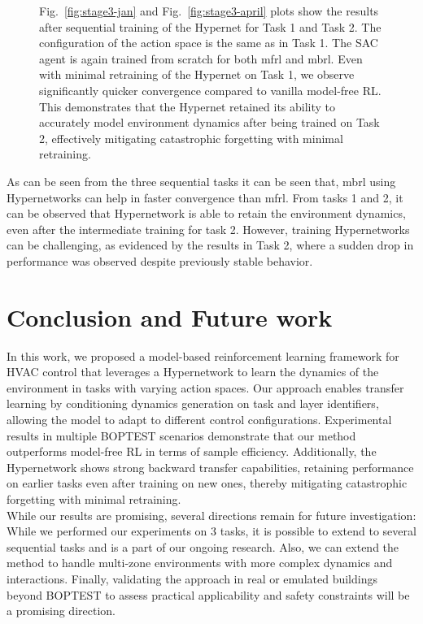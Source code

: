 \documentclass{article}
\begin{document}
\begin{figure}[H]
  \begin{minipage}[t]{\textwidth}
    \small
    Fig.~\ref{fig:stage3-jan} and Fig.~\ref{fig:stage3-april} plots show the results after sequential training of the Hypernet for Task 1 and Task 2. The configuration of the action space is the same as in Task 1. The SAC agent is again trained from scratch for both \gls{mfrl} and \gls{mbrl}. Even with minimal retraining of the Hypernet on Task 1, we observe significantly quicker convergence compared to vanilla model-free RL. This demonstrates that the Hypernet retained its ability to accurately model environment dynamics after being trained on Task 2, effectively mitigating catastrophic forgetting with minimal retraining.
  \end{minipage}
\end{figure}

As can be seen from the three sequential tasks it can be seen that, \gls{mbrl} using Hypernetworks can help in faster convergence than \gls{mfrl}. From tasks 1 and 2, it can be observed that Hypernetwork is able to retain the environment dynamics, even after the intermediate training for task 2. However, training Hypernetworks can be challenging, as evidenced by the results in Task 2, where a sudden drop in performance was observed despite previously stable behavior.

\section{Conclusion and Future work}
In this work, we proposed a model-based reinforcement learning framework for HVAC control that leverages a Hypernetwork to learn the dynamics of the environment in tasks with varying action spaces. Our approach enables transfer learning by conditioning dynamics generation on task and layer identifiers, allowing the model to adapt to different control configurations. Experimental results in multiple BOPTEST scenarios demonstrate that our method outperforms model-free RL in terms of sample efficiency.  Additionally, the Hypernetwork shows strong backward transfer capabilities, retaining performance on earlier tasks even after training on new ones, thereby mitigating catastrophic forgetting with minimal retraining.\\

While our results are promising, several directions remain for future investigation:
While we performed our experiments on 3 tasks, it is possible to extend to several sequential tasks and is a part of our ongoing research. Also, we can extend the method to handle multi-zone environments with more complex dynamics and interactions. Finally, validating the approach in real or emulated buildings beyond BOPTEST to assess practical applicability and safety constraints will be a promising direction.

%

\end{document}
